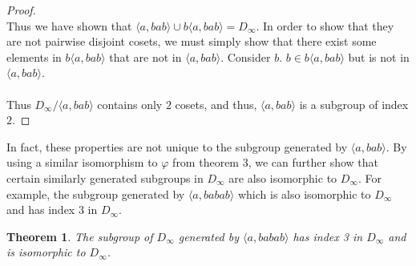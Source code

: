 \documentclass{article}
\newtheorem{theorem}{Theorem}
\theoremstyle{definition}
\begin{document}
\begin{proof}
    \\
    Thus we have shown that $\langle a,bab\rangle \cup b\langle a,bab\rangle=D_\infty$. In order to show that they are not pairwise disjoint cosets, we must simply show that there exist some elements in $b\langle a,bab\rangle$ that are not in $\langle a,bab\rangle$. Consider $b$. $b\in b\langle a,bab\rangle$ but is not in $\langle a,bab\rangle$.\\
    \\
    Thus $D_\infty/\langle a,bab\rangle$ contains only $2$ cosets, and thus, $\langle a,bab\rangle$ is a subgroup of index $2$.
\end{proof}
\noindent In fact, these properties are not unique to the subgroup generated by $\langle a,bab\rangle$. By using a similar isomorphism to $\varphi$ from theorem 3, we can further show that certain similarly generated subgroups in $D_\infty$ are also isomorphic 
 to $D_\infty$. For example, the subgroup generated by $\langle a,babab \rangle$ which is also isomorphic to $D_\infty$ and has index 3 in $D_\infty$.
\begin{theorem}
    The subgroup of $D_\infty$ generated by $\langle a,babab\rangle$ has index 3 in $D_\infty$ and is isomorphic to $D_\infty$.
\end{theorem}
\end{document}
